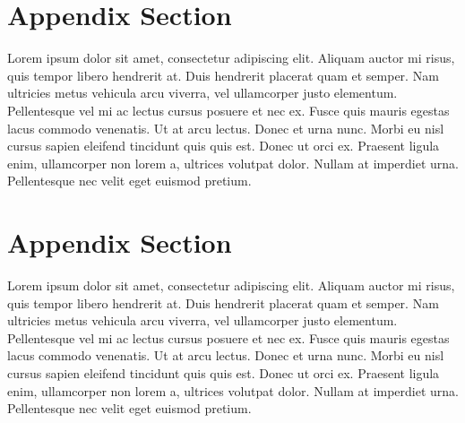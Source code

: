 \documentclass[
	a4paper, %
	12pt, %
]{CSSullivanBusinessReport}
\begin{document}
\begin{fullwidth}
\begin{justify}
\begin{appendices}
\section{Appendix Section}

Lorem ipsum dolor sit amet, consectetur adipiscing elit. Aliquam auctor mi risus, quis tempor libero hendrerit at. Duis hendrerit placerat quam et semper. Nam ultricies metus vehicula arcu viverra, vel ullamcorper justo elementum. Pellentesque vel mi ac lectus cursus posuere et nec ex. Fusce quis mauris egestas lacus commodo venenatis. Ut at arcu lectus. Donec et urna nunc. Morbi eu nisl cursus sapien eleifend tincidunt quis quis est. Donec ut orci ex. Praesent ligula enim, ullamcorper non lorem a, ultrices volutpat dolor. Nullam at imperdiet urna. Pellentesque nec velit eget euismod pretium.

\section{Appendix Section}

Lorem ipsum dolor sit amet, consectetur adipiscing elit. Aliquam auctor mi risus, quis tempor libero hendrerit at. Duis hendrerit placerat quam et semper. Nam ultricies metus vehicula arcu viverra, vel ullamcorper justo elementum. Pellentesque vel mi ac lectus cursus posuere et nec ex. Fusce quis mauris egestas lacus commodo venenatis. Ut at arcu lectus. Donec et urna nunc. Morbi eu nisl cursus sapien eleifend tincidunt quis quis est. Donec ut orci ex. Praesent ligula enim, ullamcorper non lorem a, ultrices volutpat dolor. Nullam at imperdiet urna. Pellentesque nec velit eget euismod pretium.

\end{appendices}

\end{justify}
\end{fullwidth}
\end{document}
